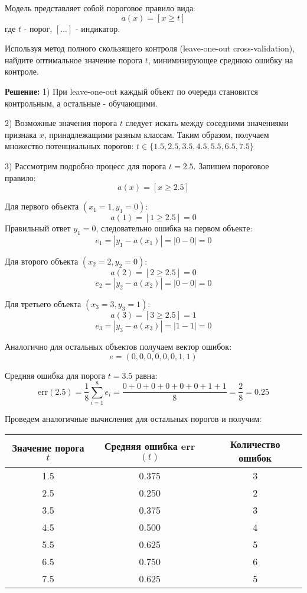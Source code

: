 Модель представляет собой пороговое правило вида:
$$a(x) = [x \geq t]$$
где $t$ - порог, $[...]$ - индикатор.

Используя метод полного скользящего контроля (leave-one-out cross-validation), найдите оптимальное значение порога $t$, минимизирующее среднюю ошибку на контроле.

\textbf{Решение:}
1) При leave-one-out каждый объект по очереди становится контрольным, а остальные - обучающими.

2) Возможные значения порога $t$ следует искать между соседними значениями признака $x$, принадлежащими разным классам. Таким образом, получаем множество потенциальных порогов:
$t \in \{1.5, 2.5, 3.5, 4.5, 5.5, 6.5, 7.5\}$

3) Рассмотрим подробно процесс для порога $t = 2.5$. Запишем пороговое правило:
$$a(x) = [x \geq 2.5]$$

Для первого объекта $(x_1 = 1, y_1 = 0)$:
$$a(1) = [1 \geq 2.5] = 0$$
Правильный ответ $y_1 = 0$, следовательно ошибка на первом объекте:
$$e_1 = |y_1 - a(x_1)| = |0 - 0| = 0$$

Для второго объекта $(x_2 = 2, y_2 = 0)$:
$$a(2) = [2 \geq 2.5] = 0$$
$$e_2 = |y_2 - a(x_2)| = |0 - 0| = 0$$

Для третьего объекта $(x_3 = 3, y_3 = 1)$:
$$a(3) = [3 \geq 2.5] = 1$$
$$e_3 = |y_3 - a(x_3)| = |1 - 1| = 0$$

Аналогично для остальных объектов получаем вектор ошибок:
$$e = (0, 0, 0, 0, 0, 0, 1, 1)$$

Средняя ошибка для порога $t = 3.5$ равна:
$$\text{err}(2.5) = \frac{1}{8}\sum_{i=1}^8 e_i = \frac{0 + 0 + 0 + 0 + 0 + 0 + 1 + 1}{8} = \frac{2}{8} = 0.25$$

Проведем аналогичные вычисления для остальных порогов и получим:

\begin{center}
\begin{tabular}{|c|c|c|}
\hline
Значение порога $t$ & Средняя ошибка err$(t)$ & Количество ошибок \\
\hline
1.5 & 0.375 & 3 \\
2.5 & 0.250 & 2 \\
3.5 & 0.375 & 3 \\
4.5 & 0.500 & 4 \\
5.5 & 0.625 & 5 \\
6.5 & 0.750 & 6 \\
7.5 & 0.625 & 5 \\
\hline
\end{tabular}
\end{center}

